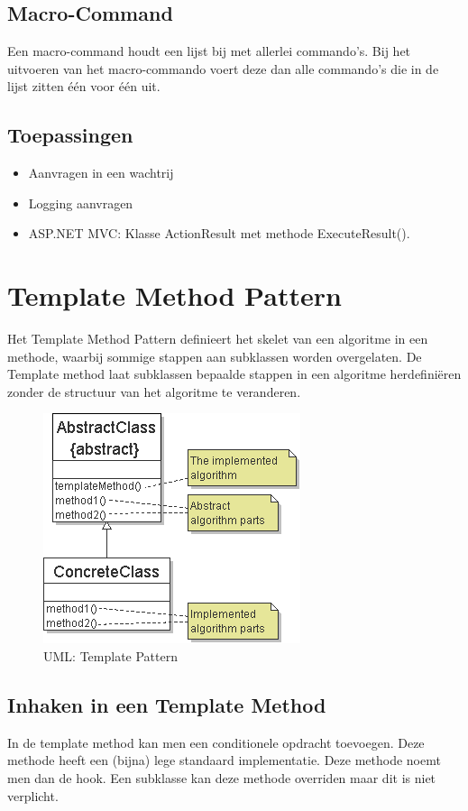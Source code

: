 \documentclass[a4paper,12pt]{article}
\begin{document}
\subsection{Macro-Command}
Een macro-command houdt een lijst bij met allerlei commando's.
Bij het uitvoeren van het macro-commando voert deze dan alle commando's die in de lijst zitten één voor één uit.

\subsection{Toepassingen}
\begin{itemize}
\item Aanvragen in een wachtrij
\item Logging aanvragen
\item ASP.NET MVC: Klasse ActionResult met methode ExecuteResult().
\end{itemize}

\section{Template Method Pattern}
Het Template Method Pattern definieert het skelet van een algoritme in een methode, waarbij sommige stappen aan subklassen worden overgelaten.
De Template method laat subklassen bepaalde stappen in een algoritme herdefiniëren zonder de structuur van het algoritme te veranderen.

\begin{figure}[H]
\centering
  	\includegraphics[width=.5\linewidth]{img/Template/Template.png}
  	\caption{UML: Template Pattern}
  	\label{fig:Template}
\end{figure}

\subsection{Inhaken in een Template Method}
In de template method kan men een conditionele opdracht toevoegen. Deze methode heeft een (bijna) lege standaard implementatie. Deze methode noemt men dan de hook. Een subklasse kan deze methode overriden maar dit is niet verplicht.
\end{document}
